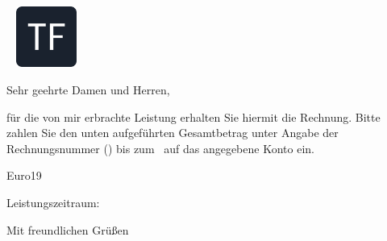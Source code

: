 \documentclass[a4paper]{scrlttr2}
\newcommand{\invoiceSalutation}{Sehr geehrte Damen und Herren,} %
\newcommand{\invoiceText}{für die von mir erbrachte Leistung erhalten Sie hiermit die Rechnung. Bitte zahlen Sie den unten aufgeführten Gesamtbetrag unter Angabe der Rechnungsnummer (\invoiceReference) bis zum \payDate \ auf das angegebene Konto ein.} %
\newcommand{\invoiceEnclosures}{} %
\newcommand{\invoiceClosing}{Mit freundlichen Grüßen}
\begin{document}
	\begin{letter}{\customerCompany \\ \customerName \\
	\customerStreet \\ \customerZIP \ \customerCity %
	}
			\includegraphics[width=0.15\textwidth]{assets/logo.png}
			\opening{\invoiceSalutation}
			\invoiceText
		    \begin{invoice}{Euro}{19}
				\fees
		    \end{invoice}
		Leistungszeitraum: \performancePeriod


		\renewcommand*{\raggedsignature}{\raggedright}
		\closing{\invoiceClosing}
		\invoiceEnclosures

	\end{letter}
\end{document}
